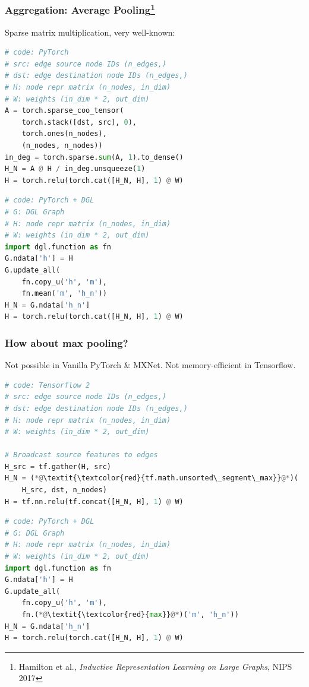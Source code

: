 \documentclass[10pt,aspectratio=169]{beamer}
\begin{document}
	\begin{frame}[fragile]
		\frametitle{Aggregation: Average Pooling\footnote{Hamilton et al., \emph{Inductive Representation Learning on Large Graphs}, NIPS 2017}}
		\begin{minipage}{0.5\textwidth}
			Sparse matrix multiplication, very well-known:
\begin{lstlisting}[language=Python]
# code: PyTorch
# src: edge source node IDs (n_edges,)
# dst: edge destination node IDs (n_edges,)
# H: node repr matrix (n_nodes, in_dim)
# W: weights (in_dim * 2, out_dim)
A = torch.sparse_coo_tensor(
    torch.stack([dst, src], 0),
    torch.ones(n_nodes),
    (n_nodes, n_nodes))
in_deg = torch.sparse.sum(A, 1).to_dense()
H_N = A @ H / in_deg.unsqueeze(1)
H = torch.relu(torch.cat([H_N, H], 1) @ W)
\end{lstlisting}
		\end{minipage}%
		\begin{minipage}{0.5\textwidth}
\begin{lstlisting}[language=Python]
# code: PyTorch + DGL
# G: DGL Graph
# H: node repr matrix (n_nodes, in_dim)
# W: weights (in_dim * 2, out_dim)
import dgl.function as fn
G.ndata['h'] = H
G.update_all(
    fn.copy_u('h', 'm'),
    fn.mean('m', 'h_n'))
H_N = G.ndata['h_n']
H = torch.relu(torch.cat([H_N, H], 1) @ W)
\end{lstlisting}
		\end{minipage}
	\end{frame}

	\begin{frame}[fragile]
		\frametitle{How about max pooling?}
		
			Not possible in Vanilla PyTorch \& MXNet.  Not memory-efficient in Tensorflow.
\begin{minipage}{0.5\textwidth}
\begin{lstlisting}[language=Python]
# code: Tensorflow 2
# src: edge source node IDs (n_edges,)
# dst: edge destination node IDs (n_edges,)
# H: node repr matrix (n_nodes, in_dim)
# W: weights (in_dim * 2, out_dim)

# Broadcast source features to edges
H_src = tf.gather(H, src)
H_N = (*@\textit{\textcolor{red}{tf.math.unsorted\_segment\_max}}@*)(
    H_src, dst, n_nodes)
H = tf.nn.relu(tf.concat([H_N, H], 1) @ W)
\end{lstlisting}
\end{minipage}%
\begin{minipage}{0.5\textwidth}
\begin{lstlisting}[language=Python]
# code: PyTorch + DGL
# G: DGL Graph
# H: node repr matrix (n_nodes, in_dim)
# W: weights (in_dim * 2, out_dim)
import dgl.function as fn
G.ndata['h'] = H
G.update_all(
    fn.copy_u('h', 'm'),
    fn.(*@\textit{\textcolor{red}{max}}@*)('m', 'h_n'))
H_N = G.ndata['h_n']
H = torch.relu(torch.cat([H_N, H], 1) @ W)
\end{lstlisting}
\end{minipage}
	\end{frame}
\end{document}
